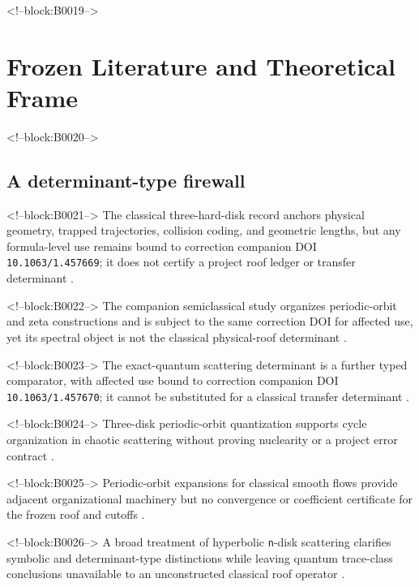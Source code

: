 \documentclass[11pt,a4paper]{article}
\begin{document}
<!--block:B0019-->
\section{Frozen Literature and Theoretical Frame}

<!--block:B0020-->
\subsection{A determinant-type firewall}

<!--block:B0021-->
The classical three-hard-disk record anchors physical geometry, trapped trajectories, collision coding, and geometric lengths, but any formula-level use remains bound to correction companion DOI \texttt{10.1063/1.457669}; it does not certify a project roof ledger or transfer determinant
\citep{P30-S01}.

<!--block:B0022-->
The companion semiclassical study organizes periodic-orbit and zeta constructions and is subject to the same correction DOI for affected use, yet its spectral object is not the classical physical-roof determinant
\citep{P30-S02}.

<!--block:B0023-->
The exact-quantum scattering determinant is a further typed comparator, with affected use bound to correction companion DOI \texttt{10.1063/1.457670}; it cannot be substituted for a classical transfer determinant
\citep{P30-S03}.

<!--block:B0024-->
Three-disk periodic-orbit quantization supports cycle organization in chaotic scattering without proving nuclearity or a project error contract
\citep{P30-S04}.

<!--block:B0025-->
Periodic-orbit expansions for classical smooth flows provide adjacent organizational machinery but no convergence or coefficient certificate for the frozen roof and cutoffs
\citep{P30-S05}.

<!--block:B0026-->
A broad treatment of hyperbolic \texttt{n}-disk scattering clarifies symbolic and determinant-type distinctions while leaving quantum trace-class conclusions unavailable to an unconstructed classical roof operator
\citep{P30-S06}.
\end{document}
